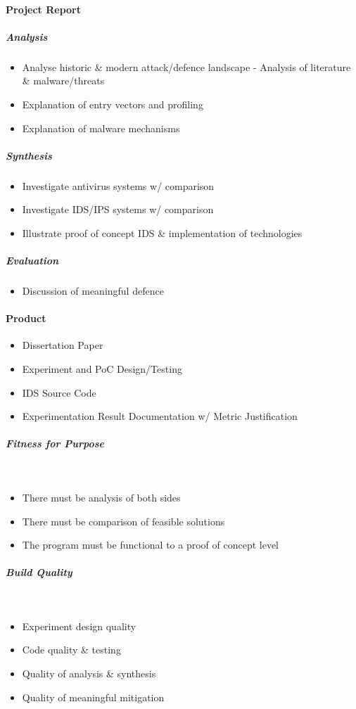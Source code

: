 \paragraph{Project Report}
\subparagraph{Analysis}
\begin{itemize}
	\item Analyse historic \& modern attack/defence landscape - Analysis of literature & malware/threats 
	\item Explanation of entry vectors and profiling
	\item Explanation of malware mechanisms
\end{itemize}

\subparagraph{Synthesis}
\begin{itemize}
	\item Investigate antivirus systems w/ comparison
	\item Investigate IDS/IPS systems w/ comparison
	\item Illustrate proof of concept IDS \& implementation of technologies
\end{itemize}

\subparagraph{Evaluation}
\begin{itemize}
	\item Discussion of meaningful defence
\end{itemize}

\paragraph{Product}
\begin{itemize}
	\item Dissertation Paper
	\item Experiment and PoC Design/Testing
	\item IDS Source Code
	\item Experimentation Result Documentation w/ Metric Justification
\end{itemize}

\subparagraph{Fitness for Purpose}~
\begin{itemize}
	\item There must be analysis of both sides
	\item There must be comparison of feasible solutions
	\item The program must be functional to a proof of concept level
\end{itemize}

\subparagraph{Build Quality}~
\begin{itemize}
	\item Experiment design quality
	\item Code quality \& testing
	\item Quality of analysis \& synthesis
	\item Quality of meaningful mitigation
\end{itemize}
